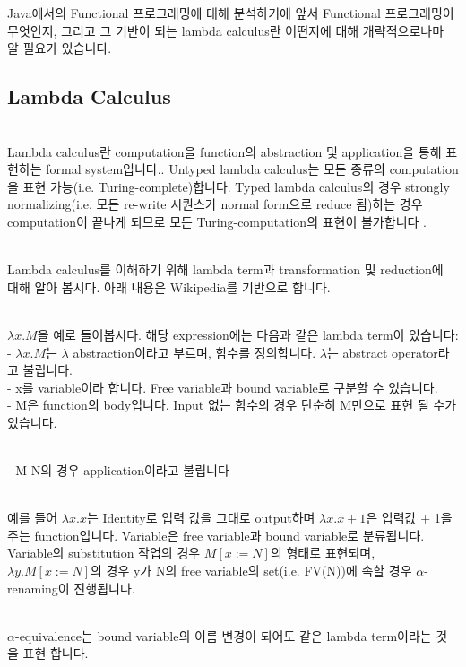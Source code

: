 \documentclass[runningheads]{llncs}
\begin{document}
Java에서의 Functional 프로그래밍에 대해 분석하기에 앞서 Functional 프로그래밍이 무엇인지, 
그리고 그 기반이 되는 lambda calculus란 어떤지에 대해 개략적으로나마 알 필요가 있습니다.

\subsection{Lambda Calculus}

\noindent \\
Lambda calculus란 computation을 function의 abstraction 및 application을 통해 표현하는 formal system입니다.\cite{ref_wiki_lambda_calculus}. 
Untyped lambda calculus는 모든 종류의 computation을 표현 가능(i.e. Turing-complete)합니다. 
Typed lambda calculus의 경우 strongly normalizing(i.e. 모든 re-write 시퀀스가 normal form으로 reduce 됨)하는 경우 computation이 끝나게 되므로 모든 Turing-computation의 표현이 불가합니다 \cite{ref_wiki_typed_lambda_calculus}.

\noindent \\
Lambda calculus를 이해하기 위해 lambda term과 transformation 및 reduction에 대해 알아 봅시다. 아래 내용은 Wikipedia를 기반으로 합니다\cite{ref_wiki_lambda_calculus_definition}\cite{ref_wiki_lambda_calculus}\cite{ref_wiki_currying}.

\noindent \\
$\lambda x.M$을 예로 들어봅시다. 해당 expression에는 다음과 같은 lambda term이 있습니다:
\noindent \\
- $\lambda x.M$는 $\lambda$ abstraction이라고 부르며, 함수를 정의합니다. $\lambda$는 abstract operator라고 불립니다.
\noindent \\
- x를 variable이라 합니다. Free variable과 bound variable로 구분할 수 있습니다.
\noindent \\
- M은 function의 body입니다. Input 없는 함수의 경우 단순히 M만으로 표현 될 수가 있습니다.

\noindent \\
- M N의 경우 application이라고 불립니다

\noindent \\
예를 들어 $\lambda x.x$는 Identity로 입력 값을 그대로 output하며  $\lambda x.x+1$은 입력값 + 1을 주는 function입니다. 
Variable은 free variable과 bound variable로 분류됩니다. 
Variable의 substitution 작업의 경우 $M[x:=N]$의 형태로 표현되며, $\lambda y.M[x:=N]$의 경우 y가 N의 free variable의 set(i.e. FV(N))에 속할 경우 $\alpha$-renaming이 진행됩니다.

\noindent \\
$\alpha$-equivalence는 bound variable의 이름 변경이 되어도 같은 lambda term이라는 것을 표현 합니다.
\end{document}
